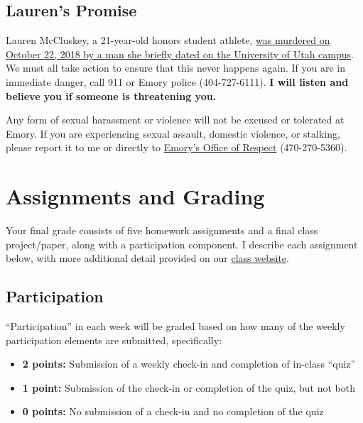 \documentclass[11pt,]{article}
\providecommand{\tightlist}{%
  \setlength{\itemsep}{0pt}\setlength{\parskip}{0pt}}
\begin{document}
\hypertarget{laurens-promise}{%
\subsection{Lauren's Promise}\label{laurens-promise}}

Lauren McCluskey, a 21-year-old honors student athlete,
\href{https://www.sltrib.com/opinion/commentary/2019/02/10/commentary-failing-lauren/}{was
murdered on October 22, 2018 by a man she briefly dated on the
University of Utah campus}. We must all take action to ensure that this
never happens again. If you are in immediate danger, call 911 or Emory
police (404-727-6111). \textbf{I will listen and believe you if someone
is threatening you.}

Any form of sexual harassment or violence will not be excused or
tolerated at Emory. If you are experiencing sexual assault, domestic
violence, or stalking, please report it to me or directly to
\href{http://respect.emory.edu/index.html}{Emory's Office of Respect}
(470-270-5360).

\hypertarget{assignments-and-grading}{%
\section{Assignments and Grading}\label{assignments-and-grading}}

Your final grade consists of five homework assignments and a final class
project/paper, along with a participation component. I describe each
assignment below, with more additional detail provided on our
\href{https://econ470s22.classes.ianmccarthyecon.com/}{class website}.

\hypertarget{participation}{%
\subsection{Participation}\label{participation}}

``Participation'' in each week will be graded based on how many of the
weekly participation elements are submitted, specifically:

\begin{itemize}
\tightlist
\item
  \textbf{2 points:} Submission of a weekly check-in and completion of
  in-class ``quiz''
\item
  \textbf{1 point:} Submission of the check-in or completion of the
  quiz, but not both
\item
  \textbf{0 points:} No submission of a check-in and no completion of
  the quiz
\end{itemize}
\end{document}
